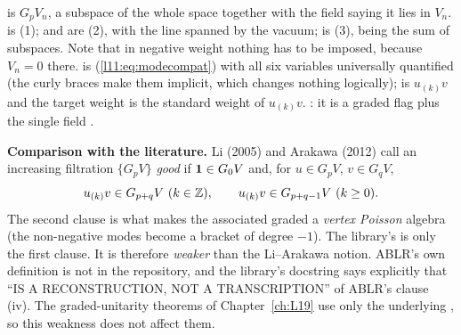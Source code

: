\begin{dictionary}
 is $G_pV_n$, a subspace of the whole space  together with the field
 saying it lies in $V_n$.  is (1);  and  are
(2), with  the line spanned by the vacuum;  is (3),  being
the sum of subspaces. Note that in negative weight nothing has to be imposed, because $V_n = 0$ there.
 is (\ref{l11:eq:modecompat}) with all six variables universally quantified
(the curly braces make them implicit, which changes nothing logically);  is
$u_{(k)}v$ and the target weight  is the standard weight of $u_{(k)}v$.
  : it is a graded flag plus the single field
.

\textbf{Comparison with the literature.} Li (2005) and Arakawa (2012) call an increasing filtration
$\{G_pV\}$ \emph{good} if $\mathbf{1}\in G_0V$ and, for $u\in G_pV$, $v\in G_qV$,
\begin{equation*}
u_{(k)}v\in G_{p+q}V\ (k\in{\mathbb{Z}}),\qquad u_{(k)}v\in G_{p+q-1}V\ (k\ge0).
\end{equation*}
The second clause is what makes the associated graded a \emph{vertex Poisson} algebra (the non-negative
modes become a bracket of degree $-1$). The library's  is only the first clause.
It is therefore \emph{weaker} than the Li--Arakawa notion. ABLR's own definition is not in the
repository, and the library's docstring says explicitly that  ``IS A
RECONSTRUCTION, NOT A TRANSCRIPTION'' of ABLR's clause (iv). The graded-unitarity theorems of
Chapter~\ref{ch:L19} use only the underlying , so this weakness does not affect them.
\end{dictionary}

